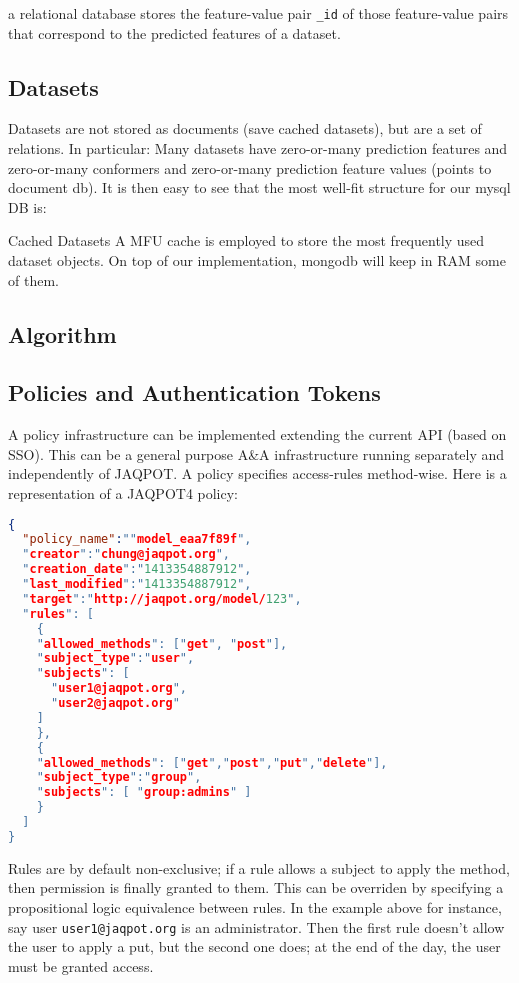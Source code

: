 a relational database stores the feature-value pair \texttt{\_id} of those 
feature-value pairs that correspond to the predicted features of a dataset. 

\subsection{Datasets}
Datasets are not stored as documents (save cached datasets), but are a set of relations. In particular:
Many datasets have zero-or-many prediction features and zero-or-many conformers and zero-or-many 
prediction feature values (points to document db).
It is then easy to see that the most well-fit structure for our mysql DB is:



Cached Datasets
A MFU cache is employed to store the most frequently used dataset objects. On top of our implementation, mongodb will keep in RAM some of them.

\subsection{Algorithm}


\subsection{Policies and Authentication Tokens}
A policy infrastructure can be implemented extending the current API 
(based on SSO). This can be a general purpose A\&A infrastructure running separately 
and independently of JAQPOT. A policy specifies access-rules method-wise. 
Here is a representation of a JAQPOT4 policy:
\begin{lstlisting}[language=json]
{
  "policy_name":""model_eaa7f89f",
  "creator":"chung@jaqpot.org",
  "creation_date":"1413354887912",
  "last_modified":"1413354887912",
  "target":"http://jaqpot.org/model/123",
  "rules": [
    {
    "allowed_methods": ["get", "post"],
    "subject_type":"user",
    "subjects": [
      "user1@jaqpot.org",
      "user2@jaqpot.org"
    ]
    },
    {
    "allowed_methods": ["get","post","put","delete"],
    "subject_type":"group",
    "subjects": [ "group:admins" ]
    }
  ]
}
\end{lstlisting}

Rules are by default non-exclusive; if a rule allows a subject to apply the method, 
then permission is finally granted to them. This can be overriden by specifying a 
propositional logic equivalence between rules. In the example above for instance, 
say user \texttt{user1@jaqpot.org} is an administrator. Then the first rule doesn't 
allow the user to apply a put, but the second one does; at the end of the day, the user 
must be granted access. 
